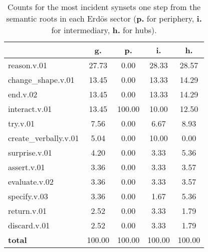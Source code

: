 \begin{table}[h!]
\begin{center}
\begin{tabular}{| l || c | c | c | c |}\hline
 & {\bf g.} & {\bf p.} & {\bf i.} & {\bf h.} \\\hline\hline
reason.v.01 & 27.73  & 0.00  & 28.33  & 28.57 \\\hline
change\_shape.v.01 & 13.45  & 0.00  & 13.33  & 14.29 \\\hline
end.v.02 & 13.45  & 0.00  & 13.33  & 14.29 \\\hline
interact.v.01 & 13.45  & 100.00  & 10.00  & 12.50 \\\hline
try.v.01 & 7.56  & 0.00  & 6.67  & 8.93 \\\hline
create\_verbally.v.01 & 5.04  & 0.00  & 10.00  & 0.00 \\\hline
surprise.v.01 & 4.20  & 0.00  & 3.33  & 5.36 \\\hline
assert.v.01 & 3.36  & 0.00  & 3.33  & 3.57 \\\hline
evaluate.v.02 & 3.36  & 0.00  & 3.33  & 3.57 \\\hline
specify.v.03 & 3.36  & 0.00  & 1.67  & 5.36 \\\hline
return.v.01 & 2.52  & 0.00  & 3.33  & 1.79 \\\hline
discard.v.01 & 2.52  & 0.00  & 3.33  & 1.79 \\\hline\hline
{{\bf total}} & 100.00  & 100.00  & 100.00  & 100.00 \\\hline
\end{tabular}
\caption{Counts for the most incident synsets one step from the semantic roots in each Erd\"os sector ({\bf p.} for periphery, {\bf i.} for intermediary, {\bf h.} for hubs).}
\end{center}
\end{table}